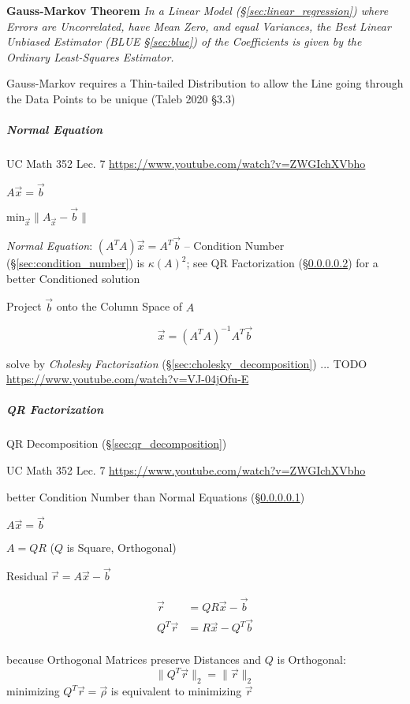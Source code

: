 \textbf{Gauss-Markov Theorem} \emph{
  In a Linear Model (\S\ref{sec:linear_regression}) where Errors are
  Uncorrelated, have Mean Zero, and equal Variances, the Best Linear Unbiased
  Estimator (BLUE \S\ref{sec:blue}) of the Coefficients is given by the Ordinary
  Least-Squares Estimator.
}

Gauss-Markov requires a Thin-tailed Distribution to allow the Line going
through the Data Points to be unique (Taleb 2020 \S 3.3)



\subparagraph{Normal Equation}\label{sec:normal_equation}\hfill

UC Math 352 Lec. 7 \url{https://www.youtube.com/watch?v=ZWGIchXVbho}

$A\vec{x} = \vec{b}$

$\mathrm{min}_{\vec{x}} \|A_{\vec{x}} - \vec{b}\|$

\emph{Normal Equation}: $(A^TA)\vec{x} = A^T\vec{b}$ -- Condition Number
(\S\ref{sec:condition_number}) is $\kappa(A)^2$; see QR Factorization
(\S\ref{sec:qr_factorization}) for a better Conditioned solution

Project $\vec{b}$ onto the Column Space of $A$

\[
  \vec{x} = (A^TA)^{-1}A^T\vec{b}
\]

solve by \emph{Cholesky Factorization} (\S\ref{sec:cholesky_decomposition}) ...
TODO \url{https://www.youtube.com/watch?v=VJ-04jOfu-E}



\subparagraph{QR Factorization}\label{sec:qr_factorization}\hfill

QR Decomposition (\S\ref{sec:qr_decomposition})

UC Math 352 Lec. 7 \url{https://www.youtube.com/watch?v=ZWGIchXVbho}

better Condition Number than Normal Equations (\S\ref{sec:normal_equation})

$A\vec{x} = \vec{b}$

$A = QR$ ($Q$ is Square, Orthogonal)

Residual $\vec{r} = A\vec{x} - \vec{b}$

\begin{align*}
     \vec{r} & = QR\vec{x} - \vec{b} \\
  Q^T\vec{r} & = R\vec{x} - Q^T\vec{b} \\
\end{align*}

because Orthogonal Matrices preserve Distances and $Q$ is Orthogonal:
\[
  \|Q^T\vec{r}\|_2 = \|\vec{r}\|_2
\]
minimizing $Q^T\vec{r} = \vec{\rho}$ is equivalent to minimizing $\vec{r}$

